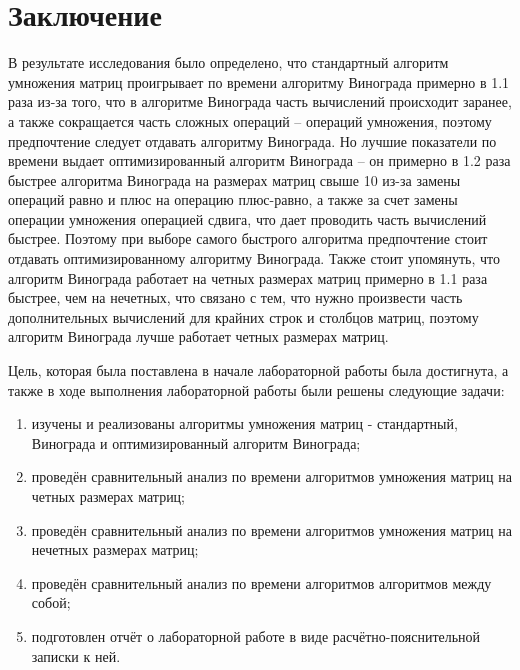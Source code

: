 \chapter*{Заключение}

В результате исследования было определено, что стандартный алгоритм умножения матриц проигрывает по времени алгоритму Винограда примерно в 1.1 раза из-за того, что в алгоритме Винограда часть вычислений происходит заранее, а также сокращается часть сложных операций -- операций умножения, поэтому предпочтение следует отдавать алгоритму Винограда. 
Но лучшие показатели по времени выдает оптимизированный алгоритм Винограда -- он примерно в 1.2 раза быстрее алгоритма Винограда на размерах матриц свыше 10 из-за замены операций равно и плюс на операцию плюс-равно, а также за счет замены операции умножения операцией сдвига, что дает проводить часть вычислений быстрее. 
Поэтому при выборе самого быстрого алгоритма предпочтение стоит отдавать оптимизированному алгоритму Винограда. 
Также стоит упомянуть, что алгоритм Винограда работает на четных размерах матриц примерно в 1.1 раза быстрее, чем на нечетных, что связано с тем, что нужно произвести часть дополнительных вычислений для крайних строк и столбцов матриц, поэтому алгоритм Винограда лучше работает четных размерах матриц.


Цель, которая была поставлена в начале лабораторной работы была достигнута, а также в ходе выполнения лабораторной работы были решены следующие задачи:

\begin{enumerate}[label=\arabic*)]
	\item изучены и реализованы алгоритмы умножения матриц - стандартный, Винограда и оптимизированный алгоритм Винограда;
    \item проведён сравнительный анализ по времени алгоритмов умножения матриц на четных размерах матриц;
	\item проведён сравнительный анализ по времени алгоритмов умножения матриц на нечетных размерах матриц;
	\item проведён сравнительный анализ по времени алгоритмов алгоритмов между собой;
	\item подготовлен отчёт о лабораторной работе в виде расчётно-пояснительной записки к ней.
\end{enumerate}
